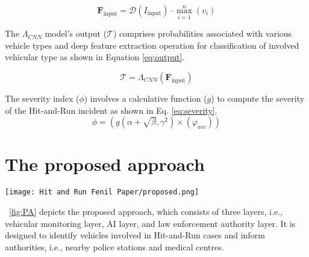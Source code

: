 \documentclass[10pt, conference, a4paper, compsocconf]{IEEEtran}
\begin{document}
\begin{equation}\label{eq:input}
    \mathbf{F}_{\text{input}} = \mathcal{D}(I_{\text{input}}) \cdot \max_{i=1}^{n}(v_i)
\end{equation}

The $\Lambda_{CNN}$ model's output ($\mathcal{T}$) comprises probabilities associated with various vehicle types and deep feature extraction operation for classification of involved vehicular type as shown in Equation \ref{eq:output}.

\begin{equation}\label{eq:output}
    \mathcal{T} = \Lambda_{CNN}(\mathbf{F}_{\text{input}})
\end{equation}

The severity index ($\phi$) involves a calculative function ($g$) to compute the severity of the Hit-and-Run incident as shown in Eq. \ref{eq:severity}.
\begin{equation}\label{eq:severity}
    \phi = \left(g(\alpha + \sqrt{\beta}, \gamma^{2}) \times (\varphi_{acc})\right)
\end{equation}
\section{The proposed approach}
\begin{figure*}[h!]
	\centering
	\texttt{[image: Hit and Run Fenil Paper/proposed.png]}
	\caption{The proposed approach.}
	\label{fig:PA}
\end{figure*}
\figurename\ \ref{fig:PA} depicts the proposed approach, which 
consists of three layers, i.e., vehicular monitoring layer, AI layer, and law enforcement authority layer. It is designed to identify vehicles involved in Hit-and-Run cases and inform authorities, i.e., nearby police stations and medical centres.
\end{document}
